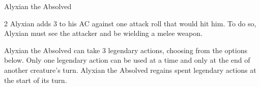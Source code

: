 \documentclass[10pt,a4paper,twoside,fancy,bg=print,twocolumn,openany,nodeprecatedcode]{dndbook}
\begin{document}
\begin{DndMonster}[float*=b,width=\textwidth + 8pt]{Alyxian the Absolved}
\begin{multicols}{2}
Alyxian adds 3 to his AC against one attack roll that would hit him. To do so, Alyxian must see the attacker and be wielding a melee weapon.

Alyxian the Absolved can take 3 legendary actions, choosing from the options below. Only one legendary action can be used at a time and only at the end of another creature's turn. Alyxian the Absolved regains spent legendary actions at the start of its turn.

\begin{DndMonsterLegendaryActions}
\end{DndMonsterLegendaryActions}

\end{multicols}
\end{DndMonster}
\end{document}
